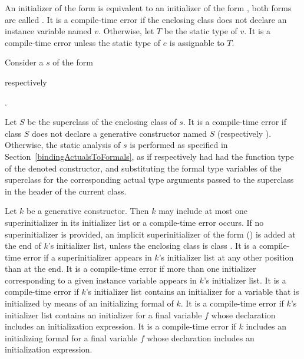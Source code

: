 \documentclass[makeidx]{article}
\begin{document}
\LMHash{}%
An initializer of the form  is equivalent to
an initializer of the form ,
both forms are called .
It is a compile-time error if the enclosing class does not declare an instance variable named $v$.
Otherwise, let $T$ be the static type of $v$.
It is a compile-time error unless the static type of $e$ is assignable to $T$.

\LMHash{}%
Consider a  $s$ of the form

respectively

.

\noindent{}%
Let $S$ be the superclass of the enclosing class of $s$.
It is a compile-time error if class $S$ does not declare a generative constructor named $S$ (respectively ).
Otherwise, the static analysis of $s$ is performed as specified in Section~\ref{bindingActualsToFormals},
as if \code{\SUPER{}} respectively 
had had the function type of the denoted constructor,
and substituting the formal type variables of the superclass
for the corresponding actual type arguments passed to the superclass
in the header of the current class.

\LMHash{}%
Let $k$ be a generative constructor.
Then $k$ may include at most one superinitializer in its initializer list or a compile-time error occurs.
If no superinitializer is provided, an implicit superinitializer of the form \SUPER{}() is added at the end of $k$'s initializer list,
unless the enclosing class is class .
It is a compile-time error if a superinitializer appears in $k$'s initializer list at any other position than at the end.
It is a compile-time error if more than one initializer corresponding to a given instance variable appears in $k$'s initializer list.
It is a compile-time error if $k$'s initializer list contains an initializer for a variable that is initialized by means of an initializing formal of $k$.
It is a compile-time error if $k$'s initializer list contains an initializer for a final variable $f$ whose declaration includes an initialization expression.
It is a compile-time error if $k$ includes an initializing formal for a final variable $f$ whose declaration includes an initialization expression.
\end{document}

